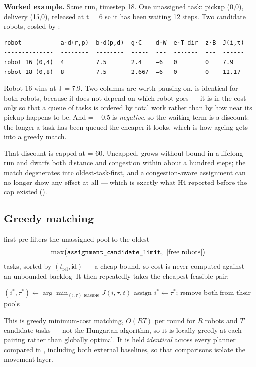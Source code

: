\begin{workedexample}
\textbf{Worked example.} Same run, timestep 18. One unassigned task: pickup (0,0), delivery (15,0), released at t = 6 so it has been waiting 12 steps. Two candidate robots, costed by :

{\fontsize{9.0}{10.8}\selectfont
\begin{verbatim}
robot           a·d(r,p)  b·d(p,d)  g·C    d·W  e·T_dir  z·B  J(i,τ)
--------------  --------  --------  -----  ---  -------  ---  ------
robot 16 (0,4)  4         7.5       2.4    −6   0        0    7.9
robot 18 (0,8)  8         7.5       2.667  −6   0        0    12.17
\end{verbatim}
}

Robot 16 wins at J = 7.9. Two columns are worth pausing on.  is identical for both robots, because it does not depend on which robot goes — it is in the cost only so that a queue of tasks is ordered by total work rather than by how near its pickup happens to be. And  = −0.5 is \emph{negative}, so the waiting term is a discount: the longer a task has been queued the cheaper it looks, which is how ageing gets into a greedy match.

That discount is capped at  = 60. Uncapped,  grows without bound in a lifelong run and dwarfs both distance and congestion within about a hundred steps; the match degenerates into oldest-task-first, and a congestion-aware assignment can no longer show any effect at all — which is exactly what H4 reported before the cap existed ().
\end{workedexample}

\subsection{Greedy matching}

 first pre-filters the unassigned pool to the
oldest
\[
  \max\bigl(\param{assignment\_candidate\_limit},\ |\text{free robots}|\bigr)
\]
tasks, sorted by $(t_{\mathrm{rel}}, \mathrm{id})$ --- a cheap bound, so cost is
never computed against an unbounded backlog. It then repeatedly takes the
cheapest feasible pair:

\begin{algorithm}[H]
\caption{}
\begin{algorithmic}[1]
  \State $(i^\ast, \tau^\ast) \gets \arg\min_{(i, \tau) \text{ feasible}} J(i, \tau, t)$
  \State assign $i^\ast \leftarrow \tau^\ast$; remove both from their pools
\EndWhile
\end{algorithmic}
\end{algorithm}

This is greedy minimum-cost matching, $O(RT)$ per round for $R$ robots and $T$
candidate tasks --- not the Hungarian algorithm, so it is locally greedy at
each pairing rather than globally optimal. It is held \emph{identical} across
every planner compared in , including both external
baselines, so that comparisons isolate the movement layer.
